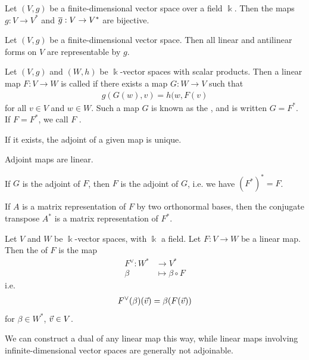\begin{theorem}
	Let $(V,g)$ be a finite-dimensional vector space over a field $\Bbbk$. Then the maps $g : V \to V^*$ and $\overline{{g}} : V \to V^*$ are bijective.
\end{theorem}
\begin{corollary}
	Let $(V,g)$ be a finite-dimensional vector space. Then all linear and antilinear forms on $V$ are representable by $g$.
\end{corollary}
\begin{definition}
	Let $(V,g)$ and $(W,h)$ be $\Bbbk$-vector spaces with scalar products. Then a linear map $F : V \to W$ is called  if there exists a map $G : W \to V$ such that
	\begin{align*}
		g(G(w),v) = h(w,F(v)
	\end{align*}
	for all $v \in V$ and $w \in W$. Such a map $G$ is known as the , and is written $G = F^*$. If $F = F^*$, we call $F$ .
\end{definition}
\begin{proposition}
	If it exists, the adjoint of a given map is unique.
\end{proposition}
\begin{proposition}
	Adjoint maps are linear.
\end{proposition}
\begin{proposition}
	If $G$ is the adjoint of $F$, then $F$ is the adjoint of $G$, i.e. we have $(F^*)^* = F$.
\end{proposition}
\begin{proposition}
	If $A$ is a matrix representation of $F$ by two orthonormal bases, then the conjugate transpose $A^*$ is a matrix representation of $F^*$.
\end{proposition}
\begin{definition}
	Let $V$ and $W$ be $\Bbbk$-vector spaces, with $\Bbbk$ a field. Let $F : V \to W$ be a linear map. Then the  of $F$ is the map 
	\begin{align*}
		F^\vee: W^* &\to V^*\\
		\beta &\mapsto \beta \circ F
	\end{align*}
	i.e.
	\begin{align*}
		F^\vee(\beta)(\vec{v}) = \beta(F(\vec{v}))
	\end{align*}
	for $\beta \in W^*$, $\vec{v} \in V$.
\end{definition}
We can construct a dual of any linear map this way, while linear maps involving infinite-dimensional vector spaces are generally not adjoinable.
